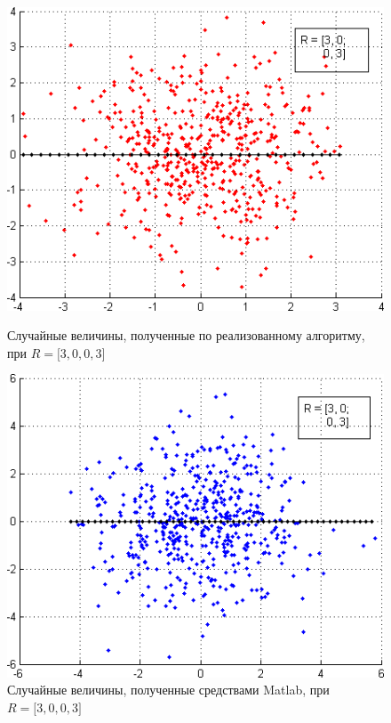 \begin{figure}[h!]
  \begin{minipage}[h!]{0.47\linewidth}
    \includegraphics[width=1\linewidth]{pic/normal_our_1}
    \caption{Случайные величины, полученные по реализованному алгоритму,
      при $ R = \big[3, 0, 0, 3 \big] $
  }
    \label{pic:normal_start}
  \end{minipage}
  \hfill
  \begin{minipage}[h!]{0.47\linewidth}
    \vspace{4mm}
    \includegraphics[width=1\linewidth]{pic/normal_matlab_1}
    \caption{Случайные величины, полученные средствами Matlab,
      при $ R = \big[3, 0, 0, 3 \big] $
    }
  \end{minipage}
\end{figure}

